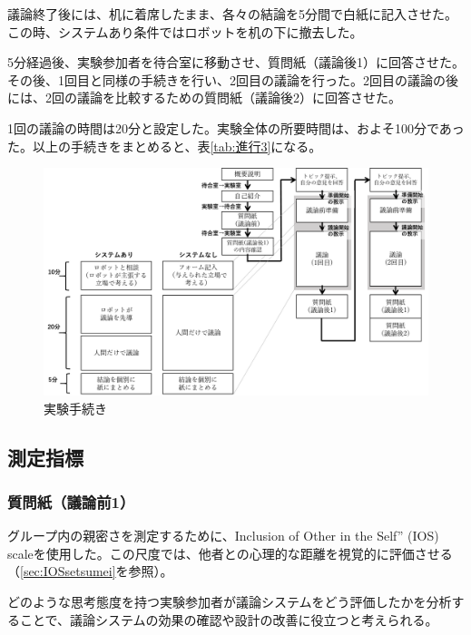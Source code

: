 \documentclass[11pt, a4paper]{jreport} %
\begin{document}
議論終了後には、机に着席したまま、各々の結論を5分間で白紙に記入させた。この時、システムあり条件ではロボットを机の下に撤去した。

5分経過後、実験参加者を待合室に移動させ、質問紙（議論後1）に回答させた。その後、1回目と同様の手続きを行い、2回目の議論を行った。2回目の議論の後には、2回の議論を比較するための質問紙（議論後2）に回答させた。


1回の議論の時間は20分と設定した。実験全体の所要時間は、およそ100分であった。以上の手続きをまとめると、表\ref{tab:進行3}になる。


\begin{figure}[htbp]
\begin{center}
\includegraphics[width=150mm]{images/実験手続き.png}
\caption{実験手続き}
\label{fig:進行3}
\end{center}
\end{figure}




\subsection{測定指標}
\subsubsection*{質問紙（議論前1）}
グループ内の親密さを測定するために、Inclusion of Other in the Self” (IOS) scaleを使用した。この尺度では、他者との心理的な距離を視覚的に評価させる（\ref{sec:IOSsetsumei}を参照）。

どのような思考態度を持つ実験参加者が議論システムをどう評価したかを分析することで、議論システムの効果の確認や設計の改善に役立つと考えられる。
\end{document}

